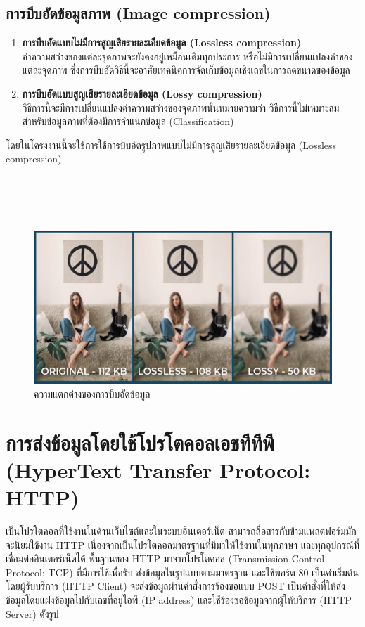 \subsection{การบีบอัดข้อมูลภาพ (Image compression)}
\begin{enumerate}
  \item \textbf{การบีบอัดแบบไม่มีการสูญเสียรายละเอียดข้อมูล (Lossless compression)} \\
  ค่าความสว่างของแต่ละจุดภาพจะยังคงอยู่เหมือนเดิมทุกประการ หรือไม่มีการเปลี่ยนแปลงค่าของแต่ละจุดภาพ 
  ซึ่งการบีบอัดวิธีนี้จะอาศัยเทคนิคการจัดเก็บข้อมูลเชิงเลขในการลดขนาดของข้อมูล
  \item \textbf{การบีบอัดแบบสูญเสียรายละเอียดข้อมูล (Lossy compression)} \\
  วิธีการนี้จะมีการเปลี่ยนแปลงค่าความสว่างของจุดภาพนั่นหมายความว่า วิธีการนี้ไม่เหมาะสมสำหรับข้อมูลภาพที่ต้องมีการจำแนกข้อมูล (Classification)
\end{enumerate}
โดยในโครงงานนี้จะใช้การใช้การบีบอัดรูปภาพแบบไม่มีการสูญเสียรายละเอียดข้อมูล (Lossless compression)
\\
\\
\\
\\
\\

\begin{figure}[!ht]
  \begin{center}
    \includegraphics[scale=.7]{pic/compressiom.png}
    \caption[ความแตกต่างของการบีบอัดข้อมูล]{ความแตกต่างของการบีบอัดข้อมูล}
    \label{fig:compressiom}
  \end{center}
\end{figure}



\section{การส่งข้อมูลโดยใช้โปรโตคอลเอชทีทีพี (HyperText Transfer Protocol: HTTP) }
เป็นโปรโตคอลที่ใช้งานในด้านเว็บไซต์และในระบบอินเตอร์เน็ต สามารถสื่อสารกับข้ามแพลตฟอร์มมักจะนิยมใช้งาน HTTP 
เนื่องจากเป็นโปรโตคอลมาตรฐานที่มีมาให้ใช้งานในทุกภาษา และทุกอุปกรณ์ที่เชื่อมต่ออินเตอร์เน็ตได้ พื้นฐานของ HTTP มาจากโปรโตคอล (Transmission Control Protocol: TCP) 
ที่มีการใช้เพื่อรับ-ส่งข้อมูลในรูปแบบตามมาตรฐาน และใช้พอร์ต 80 เป็นค่าเริ่มต้น โดยผู้รับบริการ (HTTP Client) จะส่งข้อมูลผ่านคำสั่งการร้องขอแบบ POST 
เป็นคำสั่งที่ให้ส่งข้อมูลโดยแฝงข้อมูลไปกับเลขที่อยู่ไอพี (IP address) และใช้ร้องขอข้อมูลจากผู้ให้บริการ (HTTP Server) \cite{Http} ดังรูป


